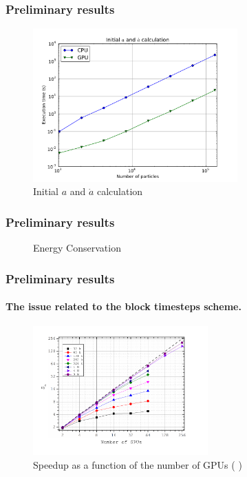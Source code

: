 \begin{frame}
    \frametitle{Preliminary results}
    \begin{figure}
        \centering
        \label{fig:init-time}
        \includegraphics[width=0.7\textwidth]{img/plot-init}
        \caption{Initial $a$ and $\dot{a}$ calculation}
    \end{figure}
\end{frame}

\begin{frame}
    \frametitle{Preliminary results}
    \begin{figure}
        \centering
        \label{fig:init-time}
        \caption{Energy Conservation}
    \end{figure}
\end{frame}

\begin{frame}
    \frametitle{Preliminary results}
    \framesubtitle{The issue related to the block timesteps scheme.}
    \begin{figure}
        \centering
        \label{fig:higpu}
        \includegraphics[width=0.6\textwidth]{img/higpu-speedup}
        \caption{Speedup as a function of the number of GPUs ( \protect \cite{2012arXiv1207.2367C})}
    \end{figure}
\end{frame}

